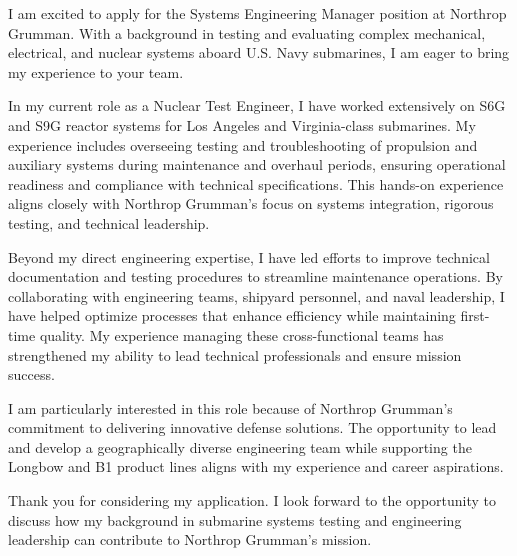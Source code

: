 I am excited to apply for the Systems Engineering Manager position at Northrop Grumman. 
With a background in testing and evaluating complex mechanical, electrical, and nuclear systems aboard U.S. Navy submarines, I am eager to bring my experience to your team.

In my current role as a Nuclear Test Engineer, I have worked extensively on S6G and S9G reactor systems for Los Angeles and Virginia-class submarines.
My experience includes overseeing testing and troubleshooting of propulsion and auxiliary systems during maintenance and overhaul periods, ensuring operational readiness and compliance with technical specifications.
This hands-on experience aligns closely with Northrop Grumman’s focus on systems integration, rigorous testing, and technical leadership.

Beyond my direct engineering expertise, I have led efforts to improve technical documentation and testing procedures to streamline maintenance operations.
By collaborating with engineering teams, shipyard personnel, and naval leadership, I have helped optimize processes that enhance efficiency while maintaining first-time quality.
My experience managing these cross-functional teams has strengthened my ability to lead technical professionals and ensure mission success.

I am particularly interested in this role because of Northrop Grumman’s commitment to delivering innovative defense solutions.
The opportunity to lead and develop a geographically diverse engineering team while supporting the Longbow and B1 product lines aligns with my experience and career aspirations.

Thank you for considering my application.
I look forward to the opportunity to discuss how my background in submarine systems testing and engineering leadership can contribute to Northrop Grumman’s mission.

